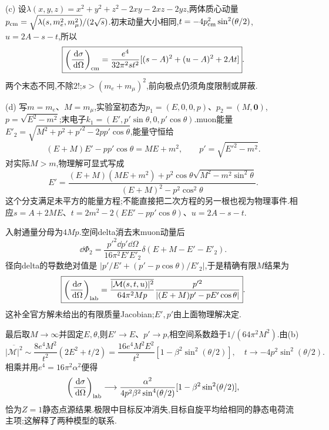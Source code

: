 \begin{solution}
(c) 设$\lambda(x,y,z)=x^2+y^2+z^2-2xy-2xz-2yz$,两体质心动量
$p_{\rm cm}=\sqrt{\lambda(s,m_e^2,m_\mu^2)}/(2\sqrt s)$.初末动量大小相同,$t=-4p_{\rm cm}^2\sin^2(\theta/2)$,$u=2A-s-t$,所以
\[
 \boxed{\left(\frac{\,\mathrm d\sigma}{\,\mathrm d\Omega}\right)_{\rm cm}
 =\frac{e^4}{32\pi^2st^2}[(s-A)^2+(u-A)^2+2At]}.
\]
两个末态不同,不除$2!$;$s>(m_e+m_\mu)^2$,前向极点仍须角度限制或屏蔽.

(d) 写$m=m_e$、$M=m_\mu$,实验室初态为$p_1=(E,0,0,p)$、$p_2=(M,\mathbf0)$,$p=\sqrt{E^2-m^2}$;末电子$k_1=(E',p'\sin\theta,0,p'\cos\theta)$.muon能量$E'_2=\sqrt{M^2+p^2+p'^2-2pp'\cos\theta}$,能量守恒给
\[
 (E+M)E'-pp'\cos\theta=ME+m^2,\qquad p'=\sqrt{E'^2-m^2}.
\]
对实际$M>m$,物理解可显式写成
\[
 E'=\frac{(E+M)(ME+m^2)+p^2\cos\theta\sqrt{M^2-m^2\sin^2\theta}}
 {(E+M)^2-p^2\cos^2\theta}.
\]
这个分支满足未平方的能量方程;不能直接把二次方程的另一根也视为物理事件.相应$s=A+2ME$、$t=2m^2-2(EE'-pp'\cos\theta)$、$u=2A-s-t$.

入射通量分母为$4Mp$.空间delta消去末muon动量后
\[
 \dd\Phi_2=\frac{p'^2\dd p'\dd\Omega}{16\pi^2E'E'_2}
 \delta(E+M-E'-E'_2).
\]
径向delta的导数绝对值是
$|p'/E'+(p'-p\cos\theta)/E'_2|$,于是精确有限$M$结果为
\[
 \boxed{\left(\frac{\,\mathrm d\sigma}{\,\mathrm d\Omega}\right)_{\rm lab}
 =\frac{\overline{|\mathcal M(s,t,u)|^2}}{64\pi^2Mp}
 \frac{p'^2}{|(E+M)p'-pE'\cos\theta|}}.
\]
这补全官方解未给出的有限质量Jacobian;$E',p'$由上面物理解决定.

最后取$M\to\infty$并固定$E,\theta$,则$E'\to E$、$p'\to p$,相空间系数趋于$1/(64\pi^2M^2)$.由(b)
\[
 \overline{|\mathcal M|^2}\sim\frac{8e^4M^2}{t^2}(2E^2+t/2)
 =\frac{16e^4M^2E^2}{t^2}[1-\beta^2\sin^2(\theta/2)],
 \quad t\to-4p^2\sin^2(\theta/2).
\]
相乘并用$e^4=16\pi^2\alpha^2$便得
\[
 \left(\frac{\,\mathrm d\sigma}{\,\mathrm d\Omega}\right)_{\rm lab}
 \longrightarrow\frac{\alpha^2}{4p^2\beta^2\sin^4(\theta/2)}
 [1-\beta^2\sin^2(\theta/2)],
\]
恰为$Z=1$静态点源结果.极限中目标反冲消失,目标自旋平均给相同的静态电荷流主项;这解释了两种模型的联系.
\end{solution}
